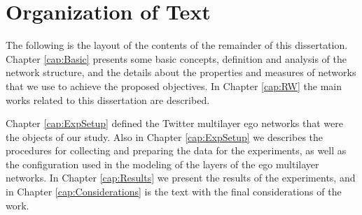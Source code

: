 

\section{Organization of Text}
\label{sec:organization}

The following is the layout of the contents of the remainder of this dissertation. Chapter \ref{cap:Basic} presents some basic concepts, definition and analysis of the network structure, and the details about the properties and measures of networks that we use to achieve the proposed objectives. In Chapter \ref{cap:RW} the main works related to this dissertation are described.

Chapter \ref{cap:ExpSetup} defined the Twitter multilayer ego networks that were the objects of our study. Also in Chapter \ref{cap:ExpSetup} we describes the procedures for collecting and preparing the data for the experiments, as well as the configuration used in the modeling of the layers of the ego multilayer networks. In Chapter \ref{cap:Results} we present the results of the experiments, and in Chapter \ref{cap:Considerations} is the text with the final considerations of the work.
